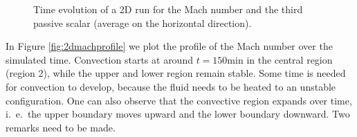 \begin{figure}[t!]
      \centering
     \centering
	\hfill
	\caption{Time evolution of a 2D run for the Mach number and the third passive scalar (average on the horizontal direction).}
	\label{fig:2dsinglefirst}
\end{figure}
In Figure \ref{fig:2dmachprofile} we plot the profile of the Mach number over the simulated time. Convection starts at around $t=150 \mathrm{min}$ in the central region (region 2), while the upper and lower region remain stable. Some time is needed for convection to develop, because the fluid needs to be heated to an unstable configuration. One can also observe that the convective region expands over time, i.\ e.\ the upper boundary moves upward and the lower boundary downward. Two remarks need to be made. 


